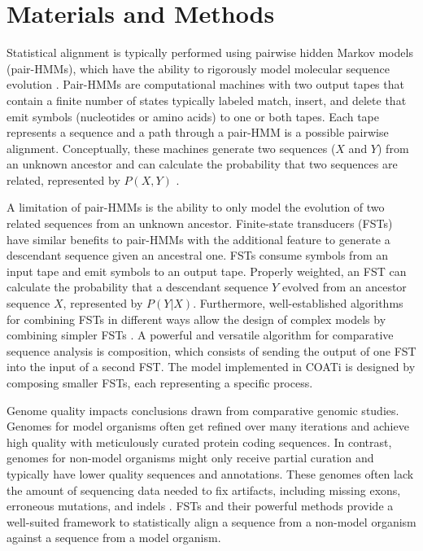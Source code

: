 \section*{Materials and Methods}  %

Statistical alignment is typically performed using pairwise hidden Markov models (pair-HMMs), which have the ability to rigorously model molecular sequence evolution \parencite{bradley2007transducers}.
Pair-HMMs are computational machines with two output tapes that contain a finite number of states typically labeled match, insert, and delete that emit symbols (nucleotides or amino acids) to one or both tapes.
Each tape represents a sequence and a path through a pair-HMM is a possible pairwise alignment.
Conceptually, these machines generate two sequences ($X$ and $Y$) from an unknown ancestor and can calculate the probability that two sequences are related, represented by $P(X, Y)$ \parencite{yoon_2009_hmm}.

A limitation of pair-HMMs is the ability to only model the evolution of two related sequences from an unknown ancestor.
Finite-state transducers (FSTs) have similar benefits to pair-HMMs with the additional feature to generate a descendant sequence given an ancestral one.
FSTs consume symbols from an input tape and emit symbols to an output tape.
Properly weighted, an FST can calculate the probability that a descendant sequence $Y$ evolved from an ancestor sequence $X$, represented by $P(Y | X)$.
Furthermore, well-established algorithms for combining FSTs in different ways allow the design of complex models by combining simpler FSTs \parencite{bradley2007transducers}.
A powerful and versatile algorithm for comparative sequence analysis is composition, which consists of sending the output of one FST into the input of a second FST.
The model implemented in COATi is designed by composing smaller FSTs, each representing a specific process.

Genome quality impacts conclusions drawn from comparative genomic studies. 
Genomes for model organisms often get refined over many iterations and achieve high quality with meticulously curated protein coding sequences.
In contrast, genomes for non-model organisms might only receive partial curation and typically have lower quality sequences and annotations.
These genomes often lack the amount of sequencing data needed to fix artifacts, including missing exons, erroneous mutations, and indels \parencite{jackman2018tigmint}.
FSTs and their powerful methods provide a well-suited framework to statistically align a sequence from a non-model organism against a sequence from a model organism.

